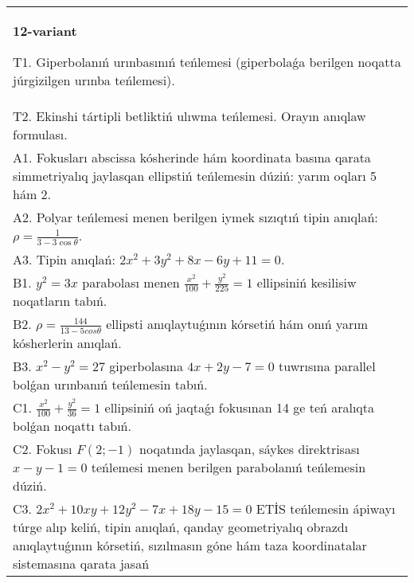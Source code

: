 \documentclass{article}
\begin{document}
\begin{tabular}{m{17cm}}
\textbf{12-variant}
\newline

T1. Giperbolanıń urınbasınıń teńlemesi (giperbolaǵa berilgen noqatta júrgizilgen urınba teńlemesi).\\

T2. Ekinshi tártipli betliktiń ulıwma teńlemesi. Orayın anıqlaw formulası.\\

A1. Fokusları abscissa kósherinde hám koordinata basına qarata simmetriyalıq jaylasqan ellipstiń teńlemesin dúziń: yarım oqları 5 hám 2.\\

A2. Polyar teńlemesi menen berilgen iymek sızıqtıń tipin anıqlań: $\rho=\frac{1}{3-3\cos\theta}$.\\

A3. Tipin anıqlań: $2 x^{2}+3 y^{2}+8 x-6 y+11=0$.\\

B1. $y^{2} = 3x$ parabolası menen $\frac{x^{2}}{100} + \frac{y^{2}}{225} = 1$ ellipsiniń kesilisiw noqatların tabıń.  \\

B2. $\rho = \frac{144}{13 - 5cos\theta}$ ellipsti anıqlaytuǵının kórsetiń hám onıń yarım kósherlerin anıqlań.\\

B3. $x^{2} - y^{2} = 27$ giperbolasına $4x + 2y - 7 = 0$ tuwrısına parallel bolǵan urınbanıń teńlemesin tabıń.  \\

C1. $\frac{x^{2}}{100} + \frac{y^{2}}{36} = 1$ ellipsiniń oń jaqtaǵı fokusınan 14 ge teń aralıqta bolǵan noqattı tabıń.  \\

C2. Fokusı $F(2; - 1)$ noqatında jaylasqan, sáykes direktrisası $x - y - 1 = 0$ teńlemesi menen berilgen parabolanıń teńlemesin dúziń.  \\

C3. $2x^{2} + 10xy + 12y^{2} - 7x + 18y - 15 = 0$ ETİS teńlemesin ápiwayı túrge alıp keliń, tipin anıqlań, qanday geometriyalıq obrazdı anıqlaytuǵının kórsetiń, sızılmasın góne hám taza koordinatalar sistemasına qarata jasań  \\

\end{tabular}
\vspace{1cm}
\end{document}
